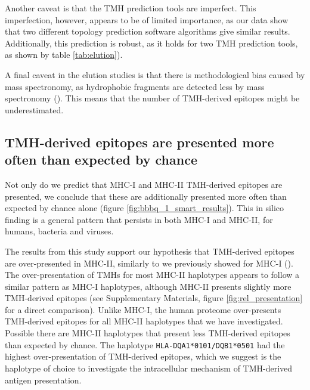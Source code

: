 Another caveat is that the TMH prediction tools are imperfect.
This imperfection, however, appears to be of limited importance,
as our data show that two different topology prediction software algorithms give similar results.
Additionally, this 
prediction is robust, as it holds for two TMH prediction tools, 
as shown by table \ref{tab:elution}).

A final caveat in the elution studies is that there is methodological bias caused by mass spectronomy,
as hydrophobic fragments are detected less 
by mass spectronomy (\cite{bianchi2017}). This means that the number of TMH-derived epitopes
might be underestimated.

\subsection{TMH-derived epitopes are presented more often than expected by chance}


Not only do we predict that MHC-I and MHC-II TMH-derived epitopes 
are presented, we conclude that these are additionally
presented more often than expected by chance 
alone (figure \ref{fig:bbbq_1_smart_results}).
This in silico finding is a general pattern 
that persists in both MHC-I and MHC-II, 
for humans, bacteria and viruses. 

The results from this study support our hypothesis 
that TMH-derived epitopes are over-presented
in MHC-II, similarly to we previously showed for MHC-I (\cite{bianchi2017}). 
The over-presentation of TMHs for most MHC-II haplotypes 
appears to follow a similar pattern as MHC-I haplotypes,
although MHC-II presents slightly more TMH-derived
epitopes (see Supplementary Materials, figure \ref{fig:rel_presentation}
for a direct comparison). 
Unlike MHC-I, the human proteome over-presents TMH-derived
epitopes for all MHC-II haplotypes that we have investigated.
Possible there are MHC-II haplotypes that present less TMH-derived
epitopes than expected by chance.
The haplotype \verb;HLA-DQA1*0101/DQB1*0501; had the highest
over-presentation of TMH-derived epitopes,
which we suggest is the haplotype of choice 
to investigate the intracellular mechanism of TMH-derived
antigen presentation.


